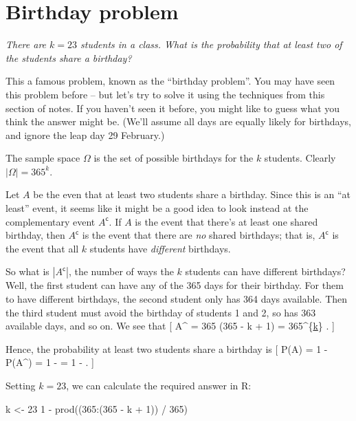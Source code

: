 \documentclass[
  letterpaper,
]{report}
\newenvironment{Shaded}{\begin{snugshade}}{\end{snugshade}}
\newcommand{\DecValTok}[1]{\textcolor[rgb]{0.68,0.00,0.00}{#1}}
\newcommand{\FunctionTok}[1]{\textcolor[rgb]{0.28,0.35,0.67}{#1}}
\newcommand{\NormalTok}[1]{\textcolor[rgb]{0.00,0.23,0.31}{#1}}
\newcommand{\OtherTok}[1]{\textcolor[rgb]{0.00,0.23,0.31}{#1}}
\newcommand{\SpecialCharTok}[1]{\textcolor[rgb]{0.37,0.37,0.37}{#1}}
\theoremstyle{definition}
\theoremstyle{definition}
\theoremstyle{remark}
\begin{document}
\hypertarget{birthday}{%
\section{Birthday problem}\label{birthday}}

\emph{There are \(k = 23\) students in a class. What is the probability
that at least two of the students share a birthday?}

This a famous problem, known as the ``birthday problem''. You may have
seen this problem before -- but let's try to solve it using the
techniques from this section of notes. If you haven't seen it before,
you might like to guess what you think the answer might be. (We'll
assume all days are equally likely for birthdays, and ignore the leap
day 29 February.)

The sample space \(\Omega\) is the set of possible birthdays for the
\(k\) students. Clearly \(|\Omega| = 365^k\).

Let \(A\) be the even that at least two students share a birthday. Since
this is an ``at least'' event, it seems like it might be a good idea to
look instead at the complementary event \(A^\mathsf{c}\). If \(A\) is
the event that there's at least one shared birthday, then
\(A^\mathsf{c}\) is the event that there are \emph{no} shared birthdays;
that is, \(A^\mathsf{c}\) is the event that all \(k\) students have
\emph{different} birthdays.

So what is \(|A^\mathsf{c}|\), the number of ways the \(k\) students can
have different birthdays? Well, the first student can have any of the
365 days for their birthday. For them to have different birthdays, the
second student only has 364 days available. Then the third student must
avoid the birthday of students 1 and 2, so has 363 available days, and
so on. We see that {[} \textbar A\^{}\textbar{} = 365
 \times \cdots \times (365 - k + 1) = 365\^{}\{\underline{k}\}
. {]}

Hence, the probability at least two students share a birthday is {[}
\mathbb P(A) = 1 - \mathbb P(A\^{}) = 1 -
 = 1 - 
\cdot {} \cdots {} . {]}

Setting \(k = 23\), we can calculate the required answer in R:

\begin{Shaded}
\begin{Highlighting}[]
\NormalTok{k }\OtherTok{\textless{}{-}} \DecValTok{23}
\DecValTok{1} \SpecialCharTok{{-}} \FunctionTok{prod}\NormalTok{((}\DecValTok{365}\SpecialCharTok{:}\NormalTok{(}\DecValTok{365} \SpecialCharTok{{-}}\NormalTok{ k }\SpecialCharTok{+} \DecValTok{1}\NormalTok{)) }\SpecialCharTok{/} \DecValTok{365}\NormalTok{)}
\end{Highlighting}
\end{Shaded}
\end{document}
